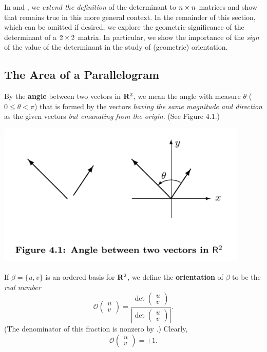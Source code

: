 \begin{remark} \label{remark 4.1.2}
In  and , we \emph{extend the definition} of the determinant to \(n \times n\) matrices and show that  remains true in this more general context.
In the remainder of this section, which can be omitted if desired, we explore the geometric significance of the determinant of a \(2 \times 2\) matrix.
In particular, we show the importance of the \emph{sign} of the value of the determinant in the study of (geometric) orientation.
\end{remark}

\subsection{The Area of a Parallelogram}

\begin{additional definition} \label{adef 4.1}
By the \textbf{angle} between two vectors in \(\mathbf{R}^2\), we mean the angle with measure \(\theta\) (\(0 \le \theta < \pi\))
that is formed by the vectors \emph{having the same magnitude and direction} as the given vectors \emph{but emanating from the origin}. (See Figure 4.1.)

\includegraphics[width=12cm]{images/figure-4-1.png}

If \(\beta = \{ u, v \}\) is an ordered basis for \(\mathbf{R}^2\), we define the \textbf{orientation} of \(\beta\) to be the \emph{real number}
\[
    \mathcal{O} \begin{pmatrix} u \\ v \end{pmatrix}
    = \frac {\det\begin{pmatrix} u \\ v \end{pmatrix}} {\left| \det\begin{pmatrix} u \\ v \end{pmatrix} \right| }.
\]
(The denominator of this fraction is nonzero by .)
Clearly,
\[
    \mathcal{O} \begin{pmatrix} u \\ v \end{pmatrix} = \pm 1.
\]
\end{additional definition}

